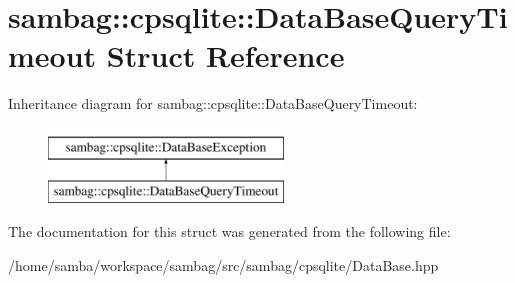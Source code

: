 \hypertarget{structsambag_1_1cpsqlite_1_1_data_base_query_timeout}{
\section{sambag::cpsqlite::DataBaseQueryTimeout Struct Reference}
\label{structsambag_1_1cpsqlite_1_1_data_base_query_timeout}
}
Inheritance diagram for sambag::cpsqlite::DataBaseQueryTimeout:\begin{figure}[H]
\begin{center}
\leavevmode
\includegraphics[height=2.000000cm]{structsambag_1_1cpsqlite_1_1_data_base_query_timeout}
\end{center}
\end{figure}


The documentation for this struct was generated from the following file:\begin{DoxyCompactItemize}
\item 
/home/samba/workspace/sambag/src/sambag/cpsqlite/DataBase.hpp\end{DoxyCompactItemize}
